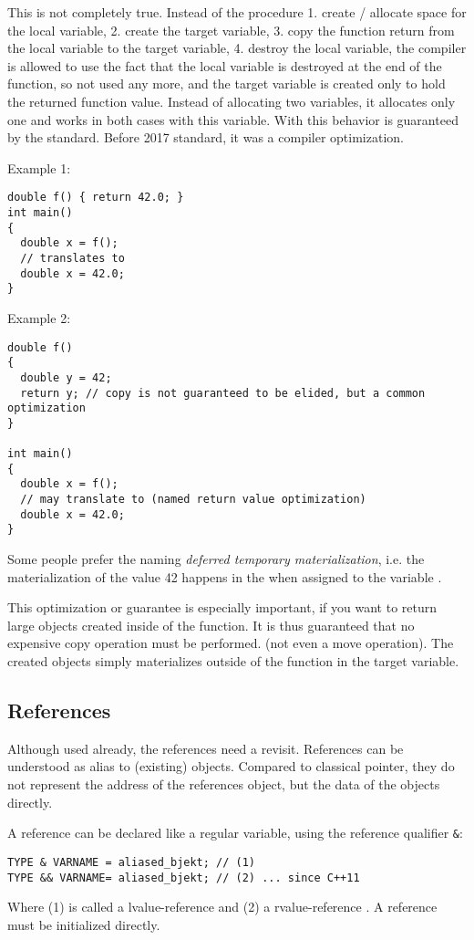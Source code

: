 This is not completely true. Instead of the procedure  1. create / allocate space for the local variable, 2. create the target variable,
3. copy the function return from the local variable to the target variable, 4. destroy the local variable, the compiler is allowed to use the
fact that the local variable is destroyed at the end of the function, so not used any more, and the target variable is created only to hold
the returned function value. Instead of allocating two variables, it allocates only one and works in both cases with this variable.
With \marginpar{[\cxx{17}]} this behavior is guaranteed by the standard. Before 2017 standard, it was a compiler optimization.

Example 1:
\begin{verbatim}
double f() { return 42.0; }
int main()
{
  double x = f();
  // translates to
  double x = 42.0;
}
\end{verbatim}

Example 2:
\begin{verbatim}
double f()
{
  double y = 42;
  return y; // copy is not guaranteed to be elided, but a common optimization
}

int main()
{
  double x = f();
  // may translate to (named return value optimization)
  double x = 42.0;
}
\end{verbatim}

Some people prefer the naming \emph{deferred temporary materialization}, i.e. the materialization of the value 42 happens in the  when
assigned to the variable .

This optimization or guarantee is especially important, if you want to return large objects created inside of the function. It is thus
guaranteed that no expensive copy operation must be performed. (not even a move operation). The created objects simply materializes outside of
the function in the target variable.


\subsection{References\label{sec:references}}
Although used already, the references need a revisit. References can be understood as alias to (existing) objects. Compared to classical
pointer, they do not represent the address of the references object, but the data of the objects directly.

A reference can be declared like a regular variable, using the reference qualifier \texttt{\&}:
\begin{verbatim}
TYPE & VARNAME = aliased_bjekt; // (1)
TYPE && VARNAME= aliased_bjekt; // (2) ... since C++11
\end{verbatim}
Where (1) is called a lvalue-reference  and (2) a rvalue-reference . A reference
must be initialized directly.

